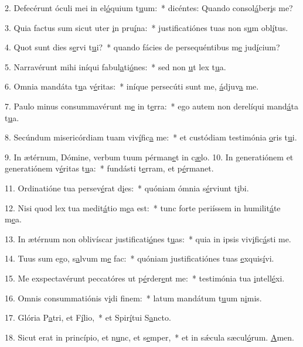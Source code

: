 2. Defecérunt óculi mei in el\uline{ó}quium t\uline{u}um:~* dicéntes: Quando consol\uline{á}ber\uline{i}s me?\par 
3. Quia factus sum sicut uter \uline{i}n pru\uline{í}na:~* justificatiónes tuas non s\uline{u}m obl\uline{í}tus.\par 
4. Quot sunt dies s\uline{e}rvi t\uline{u}i?~* quando fácies de persequéntibus m\uline{e} jud\uline{í}cium?\par 
5. Narravérunt mihi iníqui fabul\uline{a}ti\uline{ó}nes:~* sed non \uline{u}t lex t\uline{u}a.\par 
6. Omnia mandáta t\uline{u}a v\uline{é}ritas:~* iníque persecúti sunt me, \uline{á}djuv\uline{a} me.\par 
7. Paulo minus consummavérunt m\uline{e} in t\uline{e}rra:~* ego autem non derelíqui mand\uline{á}ta t\uline{u}a.\par 
8. Secúndum misericórdiam tuam viv\uline{í}fic\uline{a} me:~* et custódiam testimónia \uline{o}ris t\uline{u}i.\par 
9. In ætérnum, Dómine, verbum tuum pérman\uline{e}t in c\uline{æ}lo.
10. In generatiónem et generatiónem v\uline{é}ritas t\uline{u}a:~* fundásti t\uline{e}rram, et p\uline{é}rmanet.\par 
11. Ordinatióne tua persev\uline{é}rat d\uline{i}es:~* quóniam ómnia s\uline{é}rviunt t\uline{i}bi.\par 
12. Nisi quod lex tua medit\uline{á}tio m\uline{e}a est:~* tunc forte periíssem in humilit\uline{á}te m\uline{e}a.\par 
13. In ætérnum non oblivíscar justificati\uline{ó}nes t\uline{u}as:~* quia in ipsis viv\uline{i}fic\uline{á}sti me.\par 
14. Tuus sum ego, s\uline{a}lvum m\uline{e} fac:~* quóniam justificatiónes tuas \uline{e}xquis\uline{í}vi.\par 
15. Me exspectavérunt peccatóres ut p\uline{é}rder\uline{e}nt me:~* testimónia tua \uline{i}ntell\uline{é}xi.\par 
16. Omnis consummatiónis v\uline{i}di f\uline{i}nem:~* latum mandátum t\uline{u}um n\uline{i}mis.\par 
17. Glória P\uline{a}tri, et F\uline{í}lio,~* et Spir\uline{í}tui S\uline{a}ncto.\par 
18. Sicut erat in princípio, et n\uline{u}nc, et s\uline{e}mper,~* et in sǽcula sæcul\uline{ó}rum. \uline{A}men.\par 
